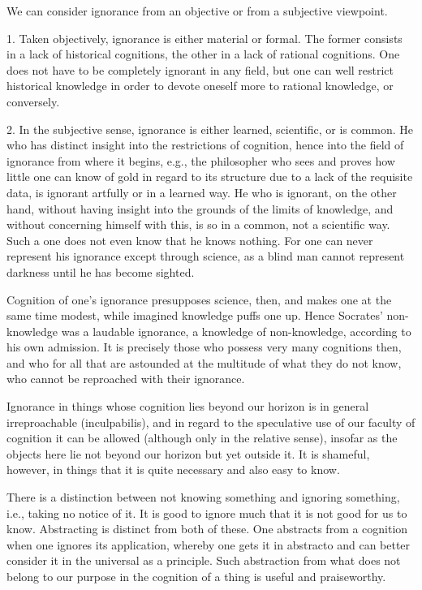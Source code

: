 We can consider ignorance
from an objective or from a subjective viewpoint.

1. Taken objectively, ignorance is either material or formal.
The former consists in a lack of historical cognitions,
the other in a lack of rational cognitions.
One does not have to be completely ignorant in any field,
but one can well restrict historical knowledge in order to
devote oneself more to rational knowledge, or conversely.

2. In the subjective sense, ignorance is either
learned, scientific, or is common.
He who has distinct insight into the restrictions of cognition,
hence into the field of ignorance from where it begins,
e.g., the philosopher who sees and proves
how little one can know of gold
in regard to its structure
due to a lack of the requisite data,
is ignorant artfully or in a learned way.
He who is ignorant, on the other hand,
without having insight into
the grounds of the limits of knowledge,
and without concerning himself with this,
is so in a common, not a scientific way.
Such a one does not even know that he knows nothing.
For one can never represent his ignorance
except through science,
as a blind man cannot represent darkness
until he has become sighted.

Cognition of one's ignorance presupposes science, then,
and makes one at the same time modest,
while imagined knowledge puffs one up.
Hence Socrates' non-knowledge was a laudable ignorance,
a knowledge of non-knowledge, according to his own admission.
It is precisely those who possess very many cognitions then,
and who for all that are astounded at
the multitude of what they do not know,
who cannot be reproached with their ignorance.

Ignorance in things whose cognition lies beyond
our horizon is in general irreproachable (inculpabilis),
and in regard to the speculative use of our faculty of cognition
it can be allowed (although only in the relative sense),
insofar as the objects here lie
not beyond our horizon but yet outside it.
It is shameful, however, in things that
it is quite necessary and also easy to know.

There is a distinction between
not knowing something
and ignoring something,
i.e., taking no notice of it.
It is good to ignore much that
it is not good for us to know.
Abstracting is distinct from both of these.
One abstracts from a cognition
when one ignores its application,
whereby one gets it in abstracto
and can better consider it in
the universal as a principle.
Such abstraction from what does not belong
to our purpose in the cognition of a thing
is useful and praiseworthy.

